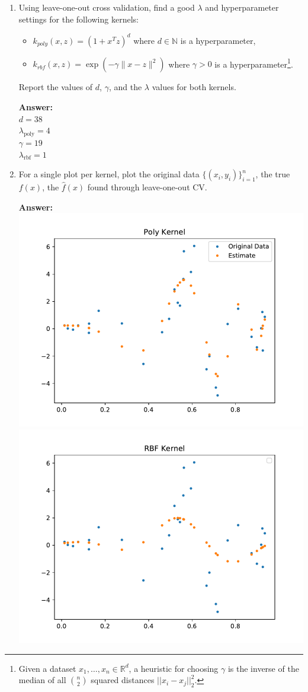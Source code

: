 \documentclass{article}
\newcommand{\field}[1]{\mathbb{#1}}
\newcommand{\1}{\mathbf{1}}
\newcommand{\R}{\field{R}} %
\begin{document}
\begin{enumerate}
  \item Using leave-one-out cross validation, find a good $\lambda$ and hyperparameter settings for the following kernels:
  \begin{itemize}
    \item $k_{poly}(x,z) = (1+x^Tz)^d$ where $d \in \mathbb{N}$ is a hyperparameter, 
    \item $k_{rbf}(x,z) = \exp(-\gamma \|x-z\|^2)$ where $\gamma > 0$ is a hyperparameter\footnote{Given a dataset $x_1,\dots,x_n \in \R^d$, a heuristic for choosing $\gamma$ is the inverse of the median of all $\binom{n}{2}$ squared distances $||x_i-x_j||_2^2$.}.
  \end{itemize} 
Report the values of $d$, $\gamma$, and the $\lambda$ values for both kernels.

\textbf{Answer:}\\
$d=38$\\
$\lambda_\text{poly}=4$ \\

$\gamma= 19$\\
$\lambda_\text{rbf}= 1$

  \item For a single plot per kernel, plot the original data $\{(x_i,y_i)\}_{i=1}^n$, the true $f(x)$, the $\widehat{f}(x)$ found through leave-one-out CV.
  
  \textbf{Answer:}\\
\includegraphics[width=4 in]{Figures/poly_kernel.pdf}\\
\includegraphics[width=4 in]{Figures/rbf_kernel.pdf}  



\end{enumerate}
\end{document}

